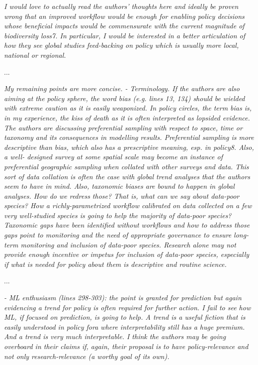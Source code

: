 \documentclass[11pt,letter]{article}
\begin{document}
\begin{mybox}
\emph{I would love to actually read the authors’ thoughts here and ideally be proven wrong that an
improved workflow would be enough for enabling policy decisions whose beneficial impacts
would be commensurate with the current magnitude of biodiversity loss7. In particular, I
would be interested in a better articulation of how they see global studies feed-backing on
policy which is usually more local, national or regional.}  
\end{mybox}

...

\begin{mybox}
\emph{My remaining points are more concise.
- Terminology. If the authors are also aiming at the policy sphere, the word bias (e.g. lines
13, 134) should be wielded with extreme caution as it is easily weaponized. In policy
circles, the term bias is, in my experience, the kiss of death as it is often interpreted as
lopsided evidence. The authors are discussing preferential sampling with respect to space,
time or taxonomy and its consequences in modelling results. Preferential sampling is more
descriptive than bias, which also has a prescriptive meaning, esp. in policy8. Also, a well-
designed survey at some spatial scale may become an instance of preferential geographic
sampling when collated with other surveys and data. This sort of data collation is often the
case with global trend analyses that the authors seem to have in mind. Also, taxonomic
biases are bound to happen in global analyses. How do we redress those? That is, what can
we say about data-poor species? How a richly-parametrized workflow calibrated on data
collected on a few very well-studied species is going to help the majority of data-poor
species? Taxonomic gaps have been identified without workflows and how to address
those gaps point to monitoring and the need of appropriate governance to ensure long-
term monitoring and inclusion of data-poor species. Research alone may not provide
enough incentive or impetus for inclusion of data-poor species, especially if what is
needed for policy about them is descriptive and routine science.}  
\end{mybox}

...

\begin{mybox}
\emph{- ML enthusiasm (lines 298-303): the point is granted for prediction but again evidencing a
trend for policy is often required for further action. I fail to see how ML, if focused on
prediction, is going to help. A trend is a useful fiction that is easily understood in policy
fora where interpretability still has a huge premium. And a trend is very much
interpretable. I think the authors may be going overboard in their claims if, again, their
proposal is to have policy-relevance and not only research-relevance (a worthy goal of its
own).}  
\end{mybox}
\end{document}
